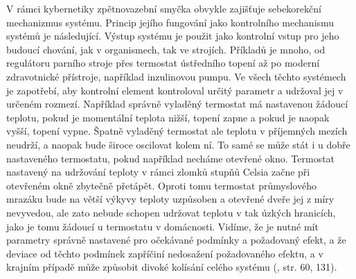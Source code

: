 \documentclass[11pt,a4paper]{article}
\begin{document}
V rámci kybernetiky zpětnovazební smyčka obvykle zajišťuje sebekorekční mechanizmus systému. Princip jejího fungování jako kontrolního mechanismu systémů je následující. Výstup systému je použit jako kontrolní vstup pro jeho budoucí chování, jak v organismech, tak ve strojích. Příkladů je mnoho, od regulátoru parního stroje přes termostat ústředního topení až po moderní zdravotnické přístroje, například inzulinovou pumpu. Ve všech těchto systémech je zapotřebí, aby kontrolní element kontroloval určitý parametr a udržoval jej v určeném rozmezí. Například správně vyladěný termostat má nastavenou žádoucí teplotu, pokud je momentální teplota nižší, topení zapne a pokud je naopak vyšší, topení vypne. Špatně vyladěný termostat ale teplotu v příjemných mezích neudrží, a naopak bude široce oscilovat kolem ní. To samé se může stát i u dobře nastaveného termostatu, pokud například necháme otevřené okno. Termostat nastavený na udržování teploty v rámci zlomků stupňů Celsia začne při otevřeném okně zbytečně přetápět. Oproti tomu termostat průmyslového mrazáku bude na větší výkyvy teploty uzpůsoben a otevřené dveře jej z míry nevyvedou, ale zato nebude schopen udržovat teplotu v tak úzkých hranicích, jako je tomu žádoucí u termostatu v domácnosti. Vidíme, že je nutné mít parametry správně nastavené pro očekávané podmínky a požadovaný efekt, a že deviace od těchto podmínek zapříčiní nedosažení požadovaného efektu, a v krajním případě může způsobit divoké kolísání celého systému (\cite{wiener_cybernetics_2019}, str. 60, 131). 
\end{document}
